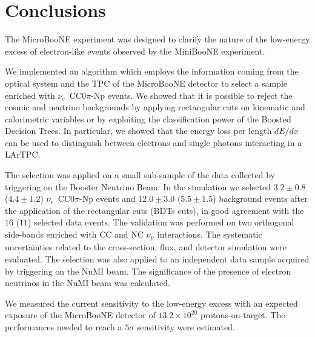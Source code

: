 \chapter{Conclusions}\label{ch:7-conclusions}
The MicroBooNE experiment was designed to clarify the nature of the low-energy excess of electron-like events observed by the MiniBooNE experiment. 

We implemented an algorithm which employs the information coming from the optical system and the TPC of the MicroBooNE detector to select a sample enriched with $\nu_e$~CC0$\pi$-Np events. We showed that it is possible to reject the cosmic and neutrino backgrounds by applying rectangular cuts on kinematic and calorimetric variables or by exploiting the classification power of the Boosted Decision Trees. In particular, we showed that the energy loss per length $dE/dx$ can be used to distinguish between electrons and single photons interacting in a LArTPC. 

The selection was applied on a small sub-sample of the data collected by triggering on the Booster Neutrino Beam. In the simulation we selected $3.2\pm0.8$ ($4.4\pm1.2$) $\nu_e$~CC0$\pi$-Np events and $12.0\pm3.0$ ($5.5\pm1.5$) background events after the application of the rectangular cuts (BDTs cuts), in good agreement with the $16$ ($11$) selected data events. The validation was performed on two orthogonal side-bands enriched with CC and NC $\nu_{\mu}$ interactions. The systematic uncertainties related to the cross-section, flux, and detector simulation were evaluated. The selection was also applied to an independent data sample acquired by triggering on the NuMI beam. The significance of the presence of electron neutrinos in the NuMI beam was calculated. 

We measured the current sensitivity to the low-energy excess with an expected exposure of the MicroBooNE detector of $13.2\times10^{20}$ protons-on-target. The performances needed to reach a $5\sigma$ sensitivity were estimated.

